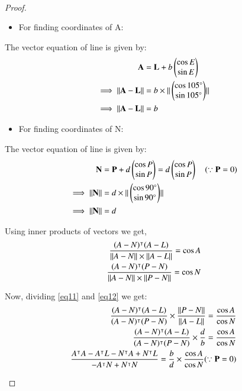 \documentclass[journal,12pt,twocolumn]{IEEEtran}
\begin{document}
\begin{enumerate}
\begin{lemma}
\begin{align}
\end{align}
\end{lemma}
\begin{proof}
\begin{itemize}
\item For finding coordinates of A:
\end{itemize}
The vector equation of line is given by:
\begin{align}
\mathbf{A}&=\mathbf{L}+b\begin{pmatrix}\cos E\\\sin E\end{pmatrix} 
\\
\implies\Vert\mathbf{A}-\mathbf{L}\rVert&=b\times\Vert\begin{pmatrix}\cos 105\degree\\\sin 105\degree\end{pmatrix}\rVert 
\\
\implies\Vert\mathbf{A}-\mathbf{L}\rVert&=b
\end{align}
\begin{itemize}
\item For finding coordinates of N:
\end{itemize}
The vector equation of line is given by:
\begin{align}
\mathbf{N}&=\mathbf{P}+d\begin{pmatrix}\cos P\\\sin P\end{pmatrix}=d\begin{pmatrix}\cos P\\\sin P\end{pmatrix} \quad(\because\mathbf{P}=0) 
\\
\implies\Vert\mathbf{N}\rVert&=d\times\Vert\begin{pmatrix}\cos 90\degree\\\sin 90\degree\end{pmatrix}\rVert 
\\
\implies\Vert\mathbf{N}\rVert&=d
\end{align}
\item Using inner products of vectors we get,
\begin{align}
\frac{(A-N)^\intercal(A-L)}{\Vert A-N\rVert\times\Vert A-L\rVert}=\cos A \label{eq11}
\\
\frac{(A-N)^\intercal(P-N)}{\Vert A-N\rVert\times\Vert P-N\rVert}=\cos N \label{eq12}
\end{align}
\item Now, dividing \eqref{eq11} and \eqref{eq12} we get:
\begin{align}
\frac{(A-N)^\intercal(A-L)}{(A-N)^\intercal(P-N)}\times\frac{\Vert P-N\rVert}{\Vert A-L\rVert}=
\frac{\cos A}{\cos N}
\\
\frac{(A-N)^\intercal(A-L)}{(A-N)^\intercal(P-N)}\times\frac{d}{b}=
\frac{\cos A}{\cos N}
\\
\frac{A^\intercal A-A^\intercal L-N^\intercal A+N^\intercal L}{-A^\intercal N+N^\intercal N}=\frac{b}{d}\times\frac{\cos A}{\cos N}(\because\mathbf{P}=0) \label{eq13}
\end{align}
\begin{align}

\end{align}
\end{proof}
\end{enumerate}
\end{document}
